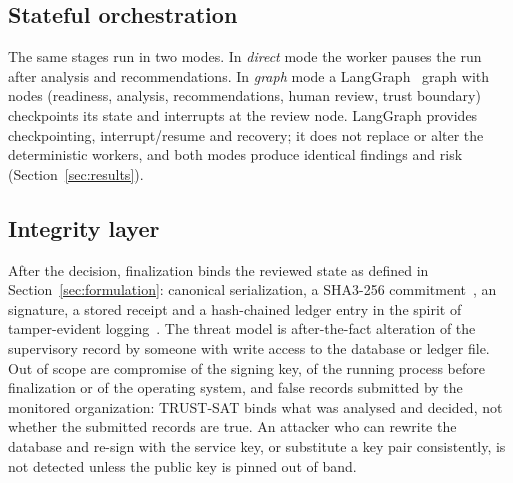 \subsection{Stateful orchestration}
The same stages run in two modes. In \emph{direct} mode the worker pauses the run after
analysis and recommendations. In \emph{graph} mode a LangGraph~\cite{langgraph2026docs}
graph with  nodes (readiness, analysis, recommendations, human
review, trust boundary) checkpoints its state and interrupts at the review node.
LangGraph provides checkpointing, interrupt/resume and recovery; it does not replace or
alter the deterministic workers, and both modes produce identical findings and risk
(Section~\ref{sec:results}).

\subsection{Integrity layer}
After the decision, finalization binds the reviewed state as defined in
Section~\ref{sec:formulation}: canonical serialization, a SHA3-256
commitment~\cite{nist2015fips202}, an ~\cite{nist2024fips204}
signature, a stored receipt and a hash-chained ledger entry in the spirit of
tamper-evident logging~\cite{schneier1999logs,crosby2009logging}. The threat model is
after-the-fact alteration of the supervisory record by someone with write access to
the database or ledger file. Out of scope are compromise of the signing key, of the
running process before finalization or of the operating system, and false records
submitted by the monitored organization: TRUST-SAT binds what was analysed and
decided, not whether the submitted records are true. An attacker who can rewrite the
database and re-sign with the service key, or substitute a key pair consistently, is
not detected unless the public key is pinned out of band.
